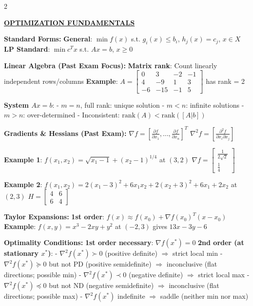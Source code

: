 \documentclass[10pt,a4paper]{article}
\newcommand{\mysection}[1]{\vspace{3pt}\textbf{\underline{#1}}\vspace{2pt}}
\newcommand{\mysubsection}[1]{\vspace{2pt}\textbf{#1:}\vspace{1pt}}
\begin{document}
\begin{multicols}{2}

\mysection{OPTIMIZATION FUNDAMENTALS}

\mysubsection{Standard Forms}
\textbf{General}: $\min f(x)$ s.t. $g_i(x) \leq b_i$, $h_j(x) = c_j$, $x \in X$
\textbf{LP Standard}: $\min c^Tx$ s.t. $Ax = b$, $x \geq 0$

\mysubsection{Linear Algebra (Past Exam Focus)}
\textbf{Matrix rank}: Count linearly independent rows/columns
\textbf{Example}: $A = \begin{bmatrix} 0 & 3 & -2 & -1 \\ 4 & -9 & 1 & 3 \\ -6 & -15 & -1 & 5 \end{bmatrix}$ has rank = 2

\textbf{System $Ax = b$}:
- $m = n$, full rank: unique solution
- $m < n$: infinite solutions  
- $m > n$: over-determined
- Inconsistent: $\text{rank}(A) < \text{rank}([A|b])$

\mysubsection{Gradients \& Hessians (Past Exam)}
$\nabla f = [\frac{\partial f}{\partial x_1}, \ldots, \frac{\partial f}{\partial x_n}]^T$
$\nabla^2 f = [\frac{\partial^2 f}{\partial x_i \partial x_j}]$

\textbf{Example 1}: $f(x_1,x_2) = \sqrt{x_1-1} + (x_2-1)^{1/4}$ at $(3,2)$
$\nabla f = \begin{bmatrix} \frac{1}{2\sqrt{2}} \\ \frac{1}{4} \end{bmatrix}$

\textbf{Example 2}: $f(x_1,x_2) = 2(x_1-3)^2 + 6x_1x_2 + 2(x_2+3)^2 + 6x_1 + 2x_2$ at $(2,3)$
$H = \begin{bmatrix} 4 & 6 \\ 6 & 4 \end{bmatrix}$

\mysubsection{Taylor Expansions}
\textbf{1st order}: $f(x) \approx f(x_0) + \nabla f(x_0)^T(x-x_0)$
\textbf{Example}: $f(x,y) = x^3 - 2xy + y^2$ at $(-2,3)$ gives $13x - 3y - 6$

\mysubsection{Optimality Conditions}
\textbf{1st order necessary}: $\nabla f(x^*) = 0$
\textbf{2nd order (at stationary $x^*$)}:
- $\nabla^2 f(x^*) \succ 0$ (positive definite) $\Rightarrow$ strict local min
- $\nabla^2 f(x^*) \succeq 0$ but not PD (positive semidefinite) $\Rightarrow$ inconclusive (flat directions; possible min)
- $\nabla^2 f(x^*) \prec 0$ (negative definite) $\Rightarrow$ strict local max
- $\nabla^2 f(x^*) \preceq 0$ but not ND (negative semidefinite) $\Rightarrow$ inconclusive (flat directions; possible max)
- $\nabla^2 f(x^*)$ indefinite $\Rightarrow$ saddle (neither min nor max)


\end{multicols}
\end{document}

